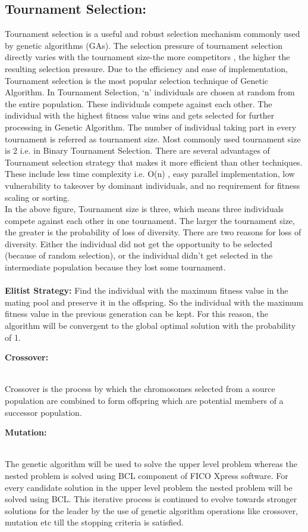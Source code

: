 \documentclass[a4paper, 12pt]{article}
\begin{document}
\subsection{Tournament Selection:}
Tournament selection is a useful and robust selection mechanism commonly used by genetic algorithms (GAs). The selection pressure of
tournament selection directly varies with the tournament size-the more competitors , the higher the resulting selection pressure. Due to the 
efficiency and ease of implementation, Tournament selection is the most popular selection technique of Genetic Algorithm. In Tournament 
Selection, ‘n’ individuals are chosen at random from the entire population. These individuals compete against each other. The individual with 
the highest fitness value wins and gets selected for further processing in Genetic Algorithm. The number of individual taking part in every 
tournament is referred as tournament size. Most commonly used tournament size is 2 i.e. in Binary Tournament Selection. There are several advantages of Tournament selection strategy that makes it more efficient than other techniques. These include less time complexity i.e. O(n) , easy 
parallel implementation, low vulnerability to takeover by dominant individuals, and no requirement for fitness scaling or sorting.\\
In the above figure, Tournament size is three, which means three individuals compete against each other in one tournament. The larger the 
tournament size, the greater is the probability of loss of diversity. There are two reasons for loss of diversity. Either the individual did 
not get the opportunity to be selected (because of random selection), or the individual didn’t get selected in the intermediate population 
because they lost some tournament.\\
\\\textbf{Elitist Strategy:}
Find the individual with the maximum fitness value in the mating pool and preserve it in the offspring. So the individual with the maximum 
fitness value in the previous generation can be kept. For this reason, the algorithm will be convergent to the global optimal solution with the
probability of 1.
\begin{large}\textbf{Crossover:}\end{large}\\
Crossover is the process by which the chromosomes selected from a source population are combined to form offspring which are potential members
of a successor population.\\
\begin{large}\textbf{Mutation:}\end{large}\\
The genetic algorithm will be used to solve the upper level problem whereas the nested problem is solved using BCL component of FICO Xpress software. For every candidate solution in the upper level problem the nested problem will be solved using BCL. This iterative process is continued to evolve towards stronger solutions for the leader by the use of genetic algorithm operations like crossover, mutation etc till the stopping criteria is satisfied.\\
\end{document}
